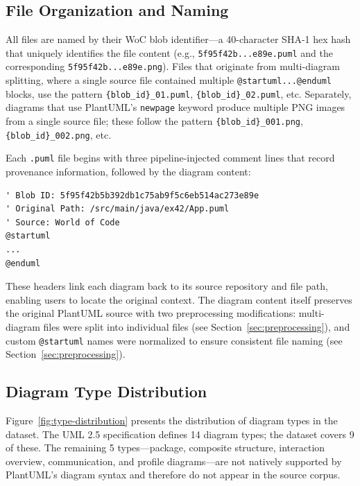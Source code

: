 \documentclass[data,datadescriptor,submit,pdftex,moreauthors]{Definitions/mdpi}
\begin{document}
\subsection{File Organization and Naming}
\label{sec:file-naming}

All files are named by their WoC blob identifier---a 40-character SHA-1 hex hash that uniquely identifies the file content (e.g., \texttt{5f95f42b...e89e.puml} and the corresponding \texttt{5f95f42b...e89e.png}). Files that originate from multi-diagram splitting, where a single source file contained multiple \texttt{@startuml...@enduml} blocks, use the pattern \texttt{\{blob\_id\}\_01.puml}, \texttt{\{blob\_id\}\_02.puml}, etc. Separately, diagrams that use PlantUML's \texttt{newpage} keyword produce multiple PNG images from a single source file; these follow the pattern \texttt{\{blob\_id\}\_001.png}, \texttt{\{blob\_id\}\_002.png}, etc.

Each \texttt{.puml} file begins with three pipeline-injected comment lines that record provenance information, followed by the diagram content:

\begin{verbatim}
' Blob ID: 5f95f42b5b392db1c75ab9f5c6eb514ac273e89e
' Original Path: /src/main/java/ex42/App.puml
' Source: World of Code
@startuml
...
@enduml
\end{verbatim}

\noindent These headers link each diagram back to its source repository and file path, enabling users to locate the original context. The diagram content itself preserves the original PlantUML source with two preprocessing modifications: multi-diagram files were split into individual files (see Section~\ref{sec:preprocessing}), and custom \texttt{@startuml} names were normalized to ensure consistent file naming (see Section~\ref{sec:preprocessing}).

\subsection{Diagram Type Distribution}
\label{sec:type-distribution}

Figure~\ref{fig:type-distribution} presents the distribution of diagram types in the dataset. The UML 2.5 specification defines 14 diagram types; the dataset covers 9 of these. The remaining 5 types---package, composite structure, interaction overview, communication, and profile diagrams---are not natively supported by PlantUML's diagram syntax and therefore do not appear in the source corpus.
\end{document}

